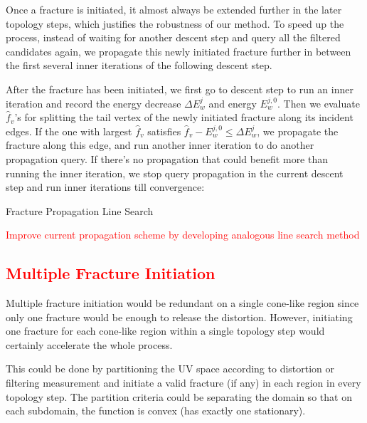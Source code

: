 Once a fracture is initiated, it almost always be extended further in the later topology steps, which justifies the robustness of our method. To speed up the process, instead of waiting for another descent step and query all the filtered candidates again, we propagate this newly initiated fracture further in between the first several inner iterations of the following descent step.

After the fracture has been initiated, we first go to descent step to run an inner iteration and record the energy decrease $\Delta E_w^j$ and energy $E_w^{j,0}$. Then we evaluate $\hat{f}_v$'s for splitting the tail vertex of the newly initiated fracture along its incident edges. If the one with largest $\hat{f}_v$ satisfies $\hat{f}_v - E_w^{j,0} \leq \Delta E_w^j$, we propagate the fracture along this edge, and run another inner iteration to do another propagation query. If there's no propagation that could benefit more than running the inner iteration, we stop query propagation in the current descent step and run inner iterations till convergence:

\begin{algorithm}[h]
\SetAlgoLined
{}
\caption{Fracture Propagation Line Search}
\end{algorithm}

\textcolor{red}{Improve current propagation scheme by developing analogous line search method}

\textcolor{red}{
\subsection{Multiple Fracture Initiation}
}
Multiple fracture initiation would be redundant on a single cone-like region since only one fracture would be enough to release the distortion. However, initiating one fracture for each cone-like region within a single topology step would certainly accelerate the whole process. 

This could be done by partitioning the UV space according to distortion or filtering measurement and initiate a valid fracture (if any) in each region in every topology step. The partition criteria could be separating the domain so that on each subdomain, the function is convex (has exactly one stationary).
